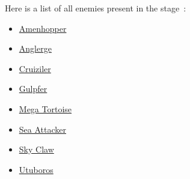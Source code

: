 Here is a list of all enemies present in the stage~\cite{wiki:Ocean}:
\begin{itemize}
	\item \hyperlink{enem:Amenhopper}{Amenhopper}
	\item \hyperlink{miniboss:Anglerge}{Anglerge}
	\item \hyperlink{miniboss:Cruiziler}{Cruiziler}
	\item \hyperlink{enem:Gulpfer}{Gulpfer }
	\item \hyperlink{enem:Mega_Tortoise}{Mega Tortoise }
	\item \hyperlink{enem:Sea_Attacker}{Sea Attacker}
	\item \hyperlink{enem:Sky_Claw}{Sky Claw }
	\item \hyperlink{miniboss:Utuboros}{Utuboros}
\end{itemize}


